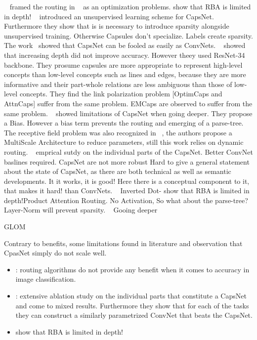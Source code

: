 \documentclass{article}
\begin{document}
~\cite{iclr/Wang018} framed the routing in ~\cite{nips/SabourFH17} as an optimization problems.
 \cite{prl/PeerSR21} show that RBA is limited in depth!
~\cite{corr/Rawlinson2018} introduced an unsupervised learning scheme for CapsNet. Furthermore they show that is is necessary to introduce sparsity alongside unsupervised training. Otherwise Capsules don't specialize. Labels create sparsity.
The work~\cite{corr/Michels19} showed that CapsNet can be fooled as easily as ConvNets.
~\cite{acml/PaikKK19} showed that increasing depth did not improve accuracy. However theey used ResNet-34 backbone. They prosume
capsules are more appropriate to represent high-level concepts than low-level concepts
such as lines and edges, because they are more informative and their part-whole
relations are less ambiguous than those of low-level concepts. They find the link polarization problem [OptimCaps and AttnCaps] suffer from the same problem. EMCaps are observed to suffer from the same problem.
~\cite{prl/PeerSR21} showed limitations of CapsNet when going deeper. They propose a Bias. However a bias term prevents the routing and emerging of a parse-tree.
The receptive field problem was also recognized in ~\cite{spl/XiangZTZX18}, the authors propose a MultiScale Architecture to reduce parameters, still this work relies on dynamic routing.
~\cite{cvpr/GuT021} emprical sutdy on the individual parts of the CapsNet. Better ConvNet baslines required. CapsNet are not more robust 
Hard to give a general statement about the state of CapsNet, as there are both technical as well as semantic developments.
It it works, it is good! Here there is a conceptual component to it, that makes it hard!
than ConvNets.
~\cite{iclr/TsaiSGS20} Inverted Dot- \cite{prl/PeerSR21} show that RBA is limited in depth!Product Attention Routing. No Activation, So what about the parse-tree? Layer-Norm will prevent sparsity.
~\cite{cvpr/RajasegaranJJJS19} Gooing deeper

GLOM ~\cite{corr/Hinton2021}

Contrary to benefits, some limitations found in literature and observation that CpasNet simply do not scale well.
\begin{itemize}
	\item \cite{acml/PaikKK19}: routing algorithms do not provide any benefit when it comes to accuracy in image classification.
	\item \cite{cvpr/GuT021}: extensive ablation study on the individual parts that constitute a CapsNet and come to mixed results. Furthermore they show that for each of the tasks they can construct a similarly parametrized ConvNet that beats the CapsNet.
	\item \cite{prl/PeerSR21} show that RBA is limited in depth!
\end{itemize}
\end{document}
